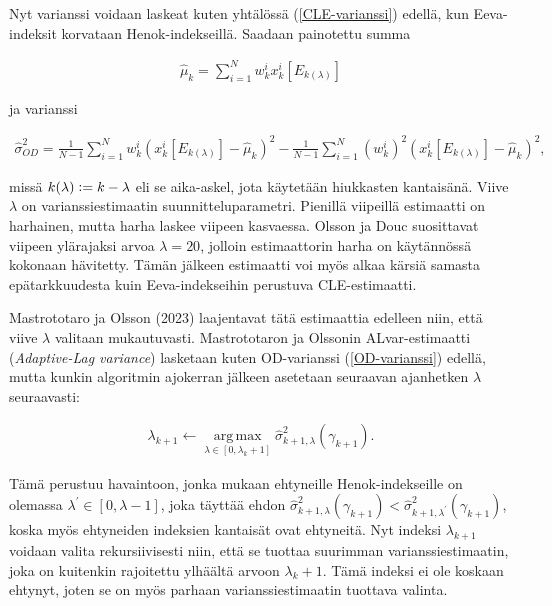 \documentclass[
  12pt,
  a4paper, twoside]{book}
\begin{document}
Nyt varianssi voidaan laskeat kuten yhtälössä (\ref{CLE-varianssi}) edellä, kun Eeva-indeksit korvataan Henok-indekseillä. Saadaan painotettu summa

\begin{align}\label{OD-sum}
\hat{\mu}_k=\sum_{i=1}^N w_k^i x_k^i[E_{k(\lambda)}]
\end{align}

\noindent ja varianssi

\begin{align}\label{OD-varianssi}
\hat{\sigma}^2_{OD} = \frac{1}{N-1} \sum_{i=1}^N w_k^i (x_k^i[E_{k(\lambda)}]-\hat{\mu}_k)^2 - \frac{1}{N-1} \sum_{i=1}^N (w_k^i)^2 (x_k^i[E_{k(\lambda)}]-\hat{\mu}_k)^2
,\end{align}

\noindent missä \(k(\lambda) \vcentcolon= k-\lambda\) eli se aika-askel, jota käytetään hiukkasten kantaisänä. Viive \(\lambda\) on varianssiestimaatin suunnitteluparametri. Pienillä viipeillä estimaatti on harhainen, mutta harha laskee viipeen kasvaessa. Olsson ja Douc suosittavat viipeen ylärajaksi arvoa \(\lambda=20\), jolloin estimaattorin harha on käytännössä kokonaan hävitetty. Tämän jälkeen estimaatti voi myös alkaa kärsiä samasta epätarkkuudesta kuin Eeva-indekseihin perustuva CLE-estimaatti.

Mastrototaro ja Olsson (2023) \citep{Mastrototaro-2023} laajentavat tätä estimaattia edelleen niin, että viive \(\lambda\) valitaan mukautuvasti. Mastrototaron ja Olssonin ALvar-estimaatti (\emph{Adaptive-Lag variance}) lasketaan kuten OD-varianssi (\ref{OD-varianssi}) edellä, mutta kunkin algoritmin ajokerran jälkeen asetetaan seuraavan ajanhetken \(\lambda\) seuraavasti:

\begin{align}\label{ALvar-lambda}
\lambda_{k+1} \leftarrow \operatorname*{arg\,max}_{\lambda \in [0, \lambda_k + 1]} \hat{\sigma}^2_{k+1,\lambda} (\gamma_{k+1})
.\end{align}

Tämä perustuu havaintoon, jonka mukaan ehtyneille Henok-indekseille on olemassa \(\lambda^\prime \in [0, \lambda-1]\), joka täyttää ehdon \(\hat{\sigma}^2_{k+1,\lambda} (\gamma_{k+1}) < \hat{\sigma}^2_{k+1,\lambda^\prime} (\gamma_{k+1})\), koska myös ehtyneiden indeksien kantaisät ovat ehtyneitä. Nyt indeksi \(\lambda_{k+1}\) voidaan valita rekursiivisesti niin, että se tuottaa suurimman varianssiestimaatin, joka on kuitenkin rajoitettu ylhäältä arvoon \(\lambda_k+1\). Tämä indeksi ei ole koskaan ehtynyt, joten se on myös parhaan varianssiestimaatin tuottava valinta.
\end{document}

